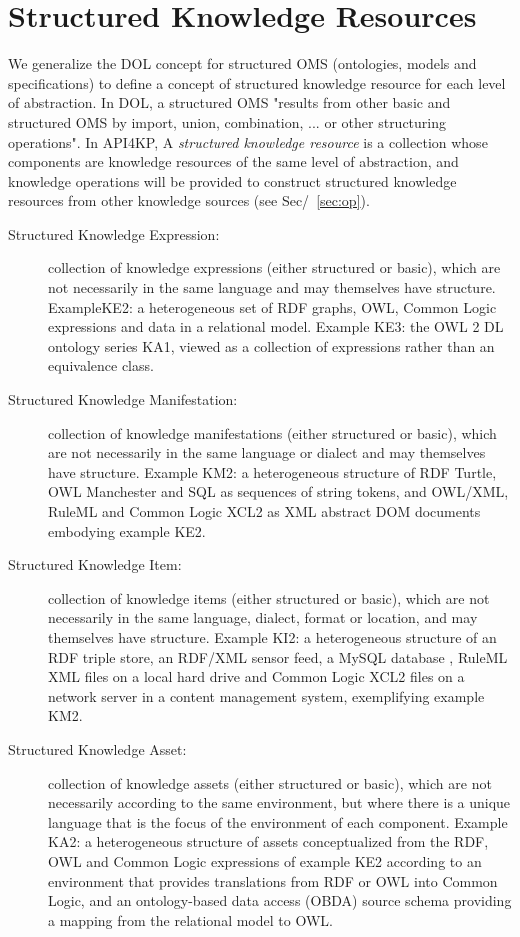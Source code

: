 \documentclass[runningheads]{llncs}
\begin{document}
\section{Structured Knowledge Resources}
\label{sec:structure}
We generalize the DOL concept for structured OMS (ontologies, models and specifications) to define a concept of structured knowledge resource for each level of abstraction. In DOL, a structured OMS "results from other basic and structured OMS by import, union, combination, ... or other structuring operations".
In API4KP, A \emph{structured knowledge resource} is a collection whose components are knowledge resources of the same level of abstraction, and knowledge operations will be provided to construct structured knowledge resources from other knowledge sources (see Sec/~\ref{sec:op}).
\begin{description}
\item[Structured Knowledge Expression:] collection of knowledge expressions (either structured or basic), which are not necessarily in the same language and may themselves have structure. ExampleKE2: a heterogeneous set of RDF graphs, OWL, Common Logic expressions and data in a relational model. Example KE3: the OWL 2 DL ontology series KA1, viewed as a collection of expressions rather than an equivalence class.
\item[Structured Knowledge Manifestation:] collection of knowledge manifestations (either structured or basic), which are not necessarily in the same language or dialect and may themselves have structure. Example KM2: a heterogeneous structure of RDF Turtle, OWL Manchester and SQL as sequences of string tokens, and OWL/XML, RuleML and Common Logic XCL2 as XML abstract DOM documents embodying example KE2.
\item[Structured Knowledge Item:] collection of knowledge items  (either structured or basic), which are not necessarily in the same language, dialect, format or location, and may themselves have structure. Example KI2:  a heterogeneous structure of an RDF triple store, an RDF/XML sensor feed, a MySQL database , RuleML XML files on a local hard drive and Common Logic XCL2 files on a network server in a content management system, exemplifying example KM2.
\item[Structured Knowledge Asset:] collection of knowledge assets  (either structured or basic), which are not necessarily according to the same environment, but where there is a unique language that is the focus of the environment of each component. Example KA2: a heterogeneous structure of assets conceptualized from the RDF, OWL and Common Logic expressions of example KE2 according to an environment that provides translations from RDF or OWL into Common Logic, and an ontology-based data access (OBDA) source schema providing a mapping from the relational model to OWL.
\end{description}
\end{document}
